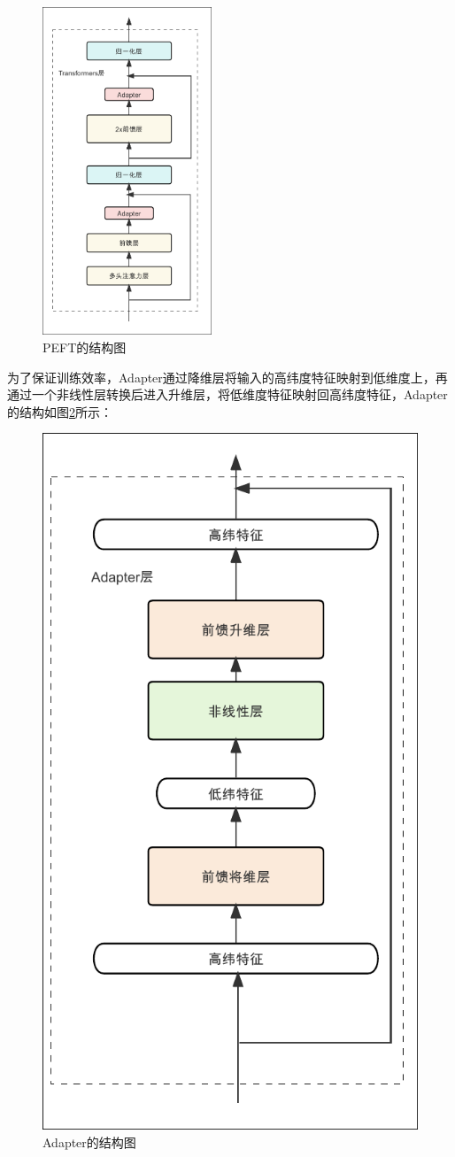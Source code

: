 \documentclass[
    decl-page,  %
    ,fontset = win, %
  ]{njuthesis}
\begin{document}
\begin{figure}[ht]
  \centering
  \includegraphics[width=0.45\textwidth]{image/PEFT.pdf}
  \caption{PEFT的结构图}
  \label{PEFT}
\end{figure}

为了保证训练效率，Adapter通过降维层将输入的高纬度特征映射到低维度上，再通过一个非线性层转换后进入升维层，将低维度特征映射回高纬度特征，Adapter的结构如图\ref{Adapter}所示：

\begin{figure}[ht]
  \centering
  \includegraphics[width=0.45 \textwidth]{image/Adapter.pdf}
  \caption{Adapter的结构图}
  \label{Adapter}
\end{figure}
\end{document}
